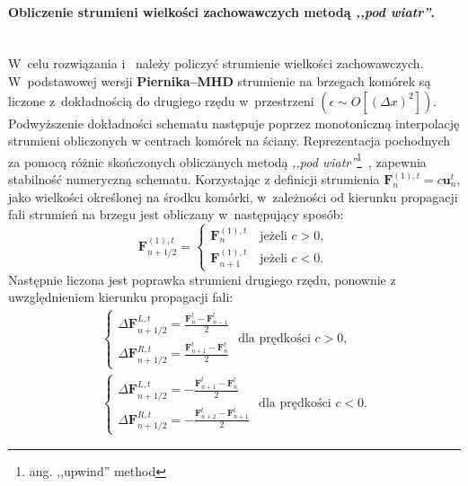 \paragraph{Obliczenie strumieni wielkości zachowawczych metodą \emph{,,pod wiatr''}.}~\\
%
W~celu rozwiązania  i~ należy policzyć strumienie
wielkości zachowawczych. W~podstawowej wersji \textbf{Piernika--MHD} strumienie
na brzegach komórek są liczone z~dokładnością do drugiego rzędu w~przestrzeni
$\left(\epsilon \sim O\left[(\Delta x)^2\right]\right)$. 
Podwyższenie dokładności schematu następuje poprzez monotoniczną interpolację
strumieni obliczonych w centrach komórek na ściany. Reprezentacja pochodnych za
pomocą różnic skończonych obliczanych metodą \emph{,,pod wiatr''}\footnote{ang.
,,upwind'' method}~\cite{cir}, zapewnia stabilność numeryczną schematu.
Korzystając z definicji strumienia $\mathbf{F}_n^{(1),t}=c \mathbf{u}_n^t$, jako
wielkości określonej na środku komórki, w~zależności od kierunku propagacji fali
strumień na brzegu jest obliczany w~następujący sposób:
%
\begin{equation}
   \mathbf{F}^{(1),t}_{n+1/2} = 
   \begin{cases}
      \mathbf{F}^{(1),t}_{n}  \quad \textrm{jeżeli }c>0,\\
      \mathbf{F}^{(1),t}_{n+1}\quad \textrm{jeżeli }c<0.
   \end{cases}
\end{equation}
%
Następnie liczona jest poprawka strumieni drugiego rzędu, ponownie z
uwzględnieniem kierunku propagacji fali:
%
\begin{align} \label{lab1}
   \begin{cases} 
      \Delta \mathbf{F}^{L,t}_{n+1/2} = \frac{\mathbf{F}^t_{n} - \mathbf{F}^t_{n-1}}{2} \\
      \Delta \mathbf{F}^{R,t}_{n+1/2} = \frac{\mathbf{F}^t_{n+1} - \mathbf{F}^t_{n}}{2}
   \end{cases} \textrm{ dla prędkości }c>0,\\
   \label{lab2}\begin{cases} 
   \Delta \mathbf{F}^{L,t}_{n+1/2} = -\frac{\mathbf{F}^t_{n+1} - \mathbf{F}^t_{n}}{2} \\
   \Delta \mathbf{F}^{R,t}_{n+1/2} = -\frac{\mathbf{F}^t_{n+2} - \mathbf{F}^t_{n+1}}{2}
   \end{cases} \textrm{ dla prędkości }c<0.
\end{align}

